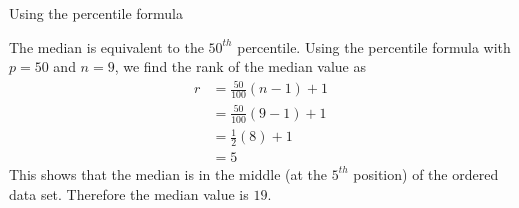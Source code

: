 \begin{wex}{Using the percentile formula}
{    

    The median is equivalent to the $50^{th}$ percentile. Using the
    percentile formula with $p=50$ and $n=9$, we find the rank of the
    median value as
    \begin{align*}
      r &= \frac{50}{100}\left(n-1\right)+1 \\
        &= \frac{50}{100}\left(9-1\right)+1 \\
        &= \frac{1}{2}(8)+1 \\
        &= 5
    \end{align*}
    This shows that the median is in the middle (at the $5^{th}$ position)
    of the ordered data set. Therefore the median value is $19$. 

}
\end{wex}


